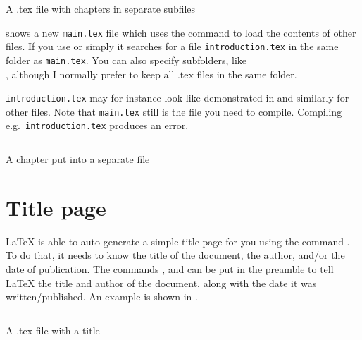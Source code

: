 {\begin{listing}
	\inputminted{latex}{latex/multifiles.tex}
	\caption{A .tex file with chapters in separate subfiles}
	\label{lst:latex:multifiles}
\end{listing}

 shows a new \verb|main.tex| file which uses the \latexin{} command to load the contents of other files. If you use \latexin{} or simply \latexin{} it searches for a file \verb|introduction.tex| in the same folder as \verb|main.tex|. You can also specify subfolders, like\\ \latexin{}, although I normally prefer to keep all .tex files in the same folder.

\verb|introduction.tex| may for instance look like demonstrated in  and similarly for other files. Note that \verb|main.tex| still is the file you need to compile. Compiling e.g.\ \verb|introduction.tex| produces an error.

\begin{listing}
	\inputminted{latex}{latex/introduction.tex}
	\caption{A chapter put into a separate file}
	\label{lst:latex:introduction}
\end{listing}

\section{Title page}
\index{\latexin{\maketitle}}
\index{\latexin{\title}}
\index{\latexin{\author}}
\index{\latexin{\date}}
\LaTeX{} is able to auto-generate a simple title page for you using the command \latexin{\maketitle}. To do that, it needs to know the title of the document, the author, and/or the date of publication. The commands \latexin{\title}, \latexin{\author} and \latexin{\date} can be put in the preamble to tell \LaTeX{} the title and author of the document, along with the date it was written/published. An example is shown in .

\begin{listing}
	\inputminted{latex}{latex/title.tex}
	\caption{A .tex file with a title}
	\label{lst:latex:title}
\end{listing}

}
